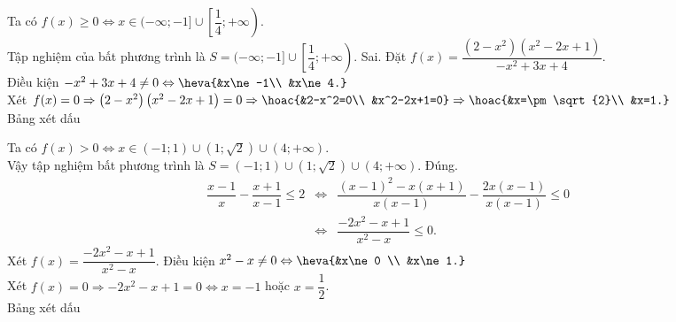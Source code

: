 \begin{ex}
{\begin{itemchoice}
\begin{center}
					\end{center}
					Ta có $f(x)\ge 0\Leftrightarrow x\in (-\infty;-1]\cup \left[\dfrac{1}{4};+\infty \right)$.\\
					Tập nghiệm của bất phương trình là $S=(-\infty;-1]\cup \left[\dfrac{1}{4};+\infty \right)$.
					\itemch Sai. Đặt $f(x)=\dfrac{\left(2-x^2\right)\left(x^2-2x+1\right)}{-x^2+3x+4}$.\\
					Điều kiện $-x^2+3x+4\ne 0\Leftrightarrow \heva{&x\ne-1\\
						&x\ne 4.}$\\
					Xét $f(x)=0\Rightarrow \left(2-x^2\right)\left(x^2-2x+1\right)=0\Rightarrow \hoac{&2-x^2=0\\
						&x^2-2x+1=0}\Rightarrow \hoac{&x=\pm \sqrt{2}\\
						&x=1.}$\\
					Bảng xét dấu
					\begin{center}
					\end{center}
					Ta có $f(x) > 0\Leftrightarrow x\in (-1;1)\cup \left(1;\sqrt{2}\right)\cup \left(4;+\infty\right)$.\\
					Vậy tập nghiệm bất phương trình là $S=(-1;1)\cup \left(1;\sqrt{2}\right)\cup \left(4;+\infty\right)$.
					\itemch Đúng.
					\begin{eqnarray*}
						\dfrac{x-1}{x}-\dfrac{x+1}{x-1} \le 2&\Leftrightarrow& \dfrac{(x-1)^2-x(x+1)}{x(x-1)}-\dfrac{2x(x-1)}{x(x-1)} \le 0\\
						&\Leftrightarrow& \dfrac{-2x^2-x+1}{x^2-x} \le 0. 
					\end{eqnarray*}
					 Xét $f(x)=\dfrac{-2x^2-x+1}{x^2-x}$. Điều kiện $x^2-x\ne 0\Leftrightarrow \heva{&x\ne 0 \\
					 	&x\ne 1.}$\\
					Xét $f(x)=0\Rightarrow-2x^2-x+1=0\Leftrightarrow x=-1$ hoặc $x=\dfrac{1}{2}$.\\
					Bảng xét dấu
					\begin{center}
						\begin{tikzpicture}[>=stealth]

\end{tikzpicture}
\end{center}
\end{itemchoice}}
\end{ex}

